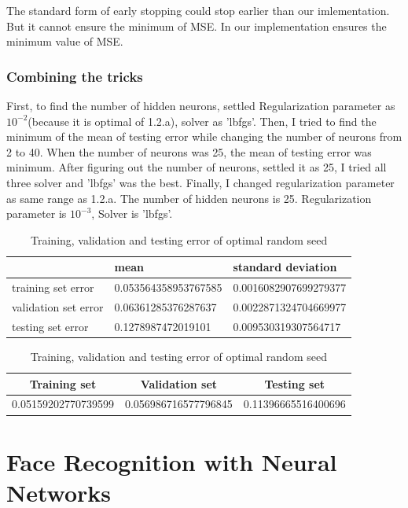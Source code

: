 \documentclass[a4paper]{article}
\begin{document}
The standard form of early stopping could stop earlier than our imlementation. But it cannot ensure the minimum of MSE.
In our implementation ensures the minimum value of MSE.
\clearpage
\subsubsection{Combining the tricks}
First, to find the number of hidden neurons, settled Regularization parameter as
$10^{-2}$(because it is optimal of 1.2.a), solver as 'lbfgs'. Then, I tried to find the minimum of the mean of
testing error while changing the number of neurons from 2 to 40. When the number
of neurons was 25, the mean of testing error was minimum. After figuring out the
number of neurons, settled it as 25, I tried all three solver and 'lbfgs' was the best.
Finally, I changed regularization parameter as same range as 1.2.a.
The number of hidden neurons is 25. Regularization parameter is $10^{-3}$, Solver is 'lbfgs'.
\begin{table}[h]
  \begin{center}
    \begin{tabular}{|l|l|l|}
      \hline
      & mean                 & standard deviation    \\ \hline
      training set error   & 0.053564358953767585 & 0.0016082907699279377 \\ \hline
      validation set error & 0.06361285376287637  & 0.0022871324704669977 \\ \hline
      testing set error    & 0.1278987472019101   & 0.009530319307564717  \\ \hline
    \end{tabular}
    \caption{Mean and standard deviation of each set}
    \vspace{2em}
    \begin{tabular}{|c|c|c|}
      \hline
      Training set        & Validation set       & Testing set         \\ \hline
      0.05159202770739599 & 0.056986716577796845 & 0.11396665516400696 \\ \hline
    \end{tabular}
    \caption{Training, validation and testing error of optimal random seed}
  \end{center}
\end{table}
\clearpage
\section{Face Recognition with Neural Networks}
\end{document}
